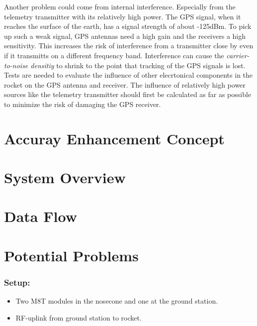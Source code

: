 Another problem could come from internal interference.
Especially from the telemetry transmitter with its relatively high power.
The GPS signal, when it reaches the surface of the earth, has a signal strength of about -125dBm.
To pick up such a weak signal, GPS antennas need a high gain and the receivers a high sensitivity.
This increases the risk of interference from a transmitter close by even if it transmitts on a different frequency band.
Interference can cause the \textit{carrier-to-noise densitiy} to shrink to the point that tracking of the GPS signals is lost.
Tests are needed to evaluate the influence of other elecrtonical components in the rocket on the GPS antenna and receiver.
The influence of relatively high power sources like the telemetry transmitter should first be calculated as far as possible to minimize the risk of damaging the GPS receiver.

\section{Accuray Enhancement Concept}

\section{System Overview}

\section{Data Flow}

\section{Potential Problems}



\subsubsection{Setup:}
\begin{itemize}
 \item Two M8T modules in the nosecone and one at the ground station.
 
 \item RF-uplink from ground station to rocket.
\end{itemize}


